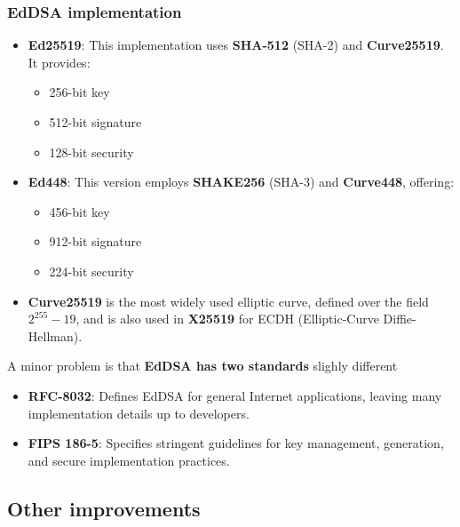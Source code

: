 \subsubsection{EdDSA implementation}

\begin{itemize}
    \item \textbf{Ed25519}: This implementation uses \textbf{SHA-512} (SHA-2) and \textbf{Curve25519}. It provides:
    \begin{itemize}[itemsep=0pt]
        \item 256-bit key
        \item 512-bit signature
        \item 128-bit security
    \end{itemize}
    
    \item \textbf{Ed448}: This version employs \textbf{SHAKE256} (SHA-3) and \textbf{Curve448}, offering:
    \begin{itemize}[itemsep=0pt]
        \item 456-bit key
        \item 912-bit signature
        \item 224-bit security
    \end{itemize}

    \item \textbf{Curve25519} is the most widely used elliptic curve, defined over the field $2^{255} - 19$, and is also used in \textbf{X25519} for ECDH (Elliptic-Curve Diffie-Hellman).
\end{itemize}
    A minor problem is that \textbf{EdDSA has two standards} slighly different 
    \begin{itemize}[itemsep=0pt]
        \item \textbf{RFC-8032}: Defines EdDSA for general Internet applications, leaving many implementation details up to developers.
        \item \textbf{FIPS 186-5}: Specifies stringent guidelines for key management, generation, and secure implementation practices.
    \end{itemize}


\subsection{Other improvements}

